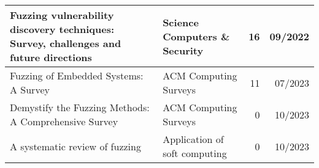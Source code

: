 \documentclass{article}
\begin{document}
{\begin{longtable}{|p{}|p{}|r|r|}
      Fuzzing vulnerability discovery techniques: Survey, challenges and future directions\cite{FuzzingVulnerabilityDiscoveryTechniques}            & Science Computers \& Security                              & 16             & 09/2022       \\\hline
      Fuzzing of Embedded Systems: A Survey\cite{Embedded}                                                                                          & ACM Computing Surveys                                      & 11             & 07/2023       \\\hline
      Demystify the Fuzzing Methods: A Comprehensive Survey\cite{Demystifying}                                                                      & ACM Computing Surveys                                      & 0              & 10/2023       \\\hline
      A systematic review of fuzzing\cite{SystematicReview2023}                                                                                     & Application of soft computing                              & 0              & 10/2023       \\\hline
  \end{longtable}
 }
\end{document}
